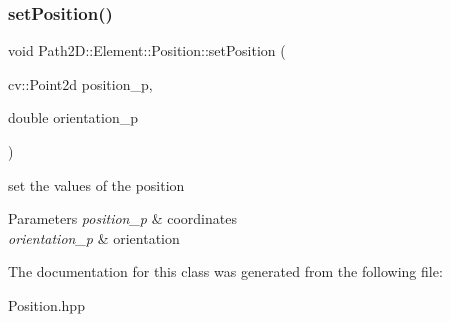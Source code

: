 \subsubsection{\texorpdfstring{set\+Position()}{setPosition()}}
{\footnotesize\ttfamily void Path2\+D\+::\+Element\+::\+Position\+::set\+Position (\begin{DoxyParamCaption}\item[{cv\+::\+Point2d}]{position\+\_\+p,  }\item[{double}]{orientation\+\_\+p }\end{DoxyParamCaption})}



set the values of the position 


\begin{DoxyParams}{Parameters}
{\em position\+\_\+p} & coordinates \\
\hline
{\em orientation\+\_\+p} & orientation \\
\hline
\end{DoxyParams}


The documentation for this class was generated from the following file\+:\begin{DoxyCompactItemize}
\item 
Position.\+hpp\end{DoxyCompactItemize}
